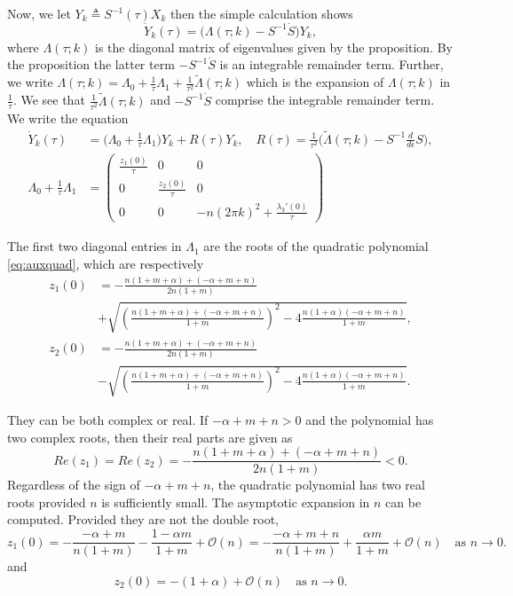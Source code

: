 \documentclass[a4paper,11pt]{article}
\theoremstyle{remark}
\begin{document}
Now, we let $Y_k \triangleq S^{-1}(\tau)X_k$ then the simple calculation shows
$$ \dot{Y}_k(\tau) = \Big(\Lambda(\tau;k) - S^{-1}\dot{S}\Big) Y_k,$$
where $\Lambda(\tau;k)$ is the diagonal matrix of eigenvalues given by the proposition. By the proposition the latter term $- S^{-1}\dot{S}$ is an integrable remainder term. Further, we write $\Lambda(\tau;k) = \Lambda_0 + \frac{1}{\tau}\Lambda_1 + \frac{1}{\tau^2}\tilde{\Lambda}(\tau;k)$ which is the expansion of $\Lambda(\tau;k)$ in $\frac{1}{\tau}$. We see that $\frac{1}{\tau^2}\tilde{\Lambda}(\tau;k)$ and $- S^{-1}\dot{S}$ comprise the integrable remainder term. We write the equation
\begin{align}
\dot{Y}_k(\tau) &= \Big(\Lambda_0 + \frac{1}{\tau}\Lambda_1\Big) Y_k + R(\tau) Y_k, \quad R(\tau) = \frac{1}{\tau^2}\Big(\tilde{\Lambda}(\tau;k)- S^{-1}\frac{d}{d\epsilon}{S}\Big), \label{eq:diagonalsystem} \\
 \Lambda_0 + \frac{1}{\tau}\Lambda_1 &=
 \begin{pmatrix}
  \frac{z_1(0)}{\tau} & 0 & 0\\
  0 & \frac{z_2(0)}{\tau} & 0\\
  0 & 0 & -n(2\pi k)^2 + \frac{\lambda_3'(0)}{\tau} \label{eq:order1diag}
 \end{pmatrix}
\end{align}




The first two diagonal entries in $\Lambda_1$ are the roots of the quadratic polynomial \eqref{eq:auxquad}, which are respectively
\begin{align*}
 z_1(0) &= -\frac{n(1+m+\alpha) + (-\alpha+m+n)}{2n(1+m)} \\
 &+ \sqrt{\left(\frac{n(1+m+\alpha) + (-\alpha+m+n)}{1+m}\right)^2 -4 \frac{n(1+\alpha)(-\alpha+m+n)}{1+m}},\\
 z_2(0) &= -\frac{n(1+m+\alpha) + (-\alpha+m+n)}{2n(1+m)} \\
 &- \sqrt{\left(\frac{n(1+m+\alpha) + (-\alpha+m+n)}{1+m}\right)^2 -4 \frac{n(1+\alpha)(-\alpha+m+n)}{1+m}}.
\end{align*}


They can be both complex or real. If $-\alpha+m+n>0$ and the polynomial has two complex roots, then their real parts are given as
$$ Re(z_1) = Re(z_2) = -\frac{n(1+m+\alpha) + (-\alpha+m+n)}{2n(1+m)} < 0.$$
Regardless of the sign of $-\alpha+m+n$, the quadratic polynomial has two real roots provided $n$ is sufficiently small. The asymptotic expansion in $n$ can be computed.  Provided they are not the double root,
$$z_1(0)=- \frac{-\alpha+m}{n(1+m)} - \frac{1-\alpha m}{1+m} + \mathcal{O}(n) =  -\frac{-\alpha+m+n}{n(1+m)} + \frac{\alpha m}{1+m}+ \mathcal{O}(n)\quad \text{as $n \rightarrow 0$.}$$ and
$$z_2(0)=-(1+\alpha) + \mathcal{O}(n) \quad \text{as $n \rightarrow 0$.} $$
\end{document}

